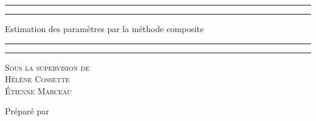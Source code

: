 \documentclass[11pt]{article}
\begin{document}
\renewcommand{\tablename}{Tableau}
\renewcommand{\figurename}{Illustration}

	\begin{titlepage}
		\centering %
		
		\scshape %
		
		\vspace*{7\baselineskip} %
		
		
		\rule{\textwidth}{1.6pt}\vspace*{-\baselineskip}\vspace*{2pt} %
		\rule{\textwidth}{0.4pt} %
		
		\vspace{0.75\baselineskip} %
		{\LARGE Estimation des paramètres par la méthode composite \\} %
		\vspace{0.75\baselineskip} %
		
		\rule{\textwidth}{0.4pt}\vspace*{-\baselineskip}\vspace{3.2pt} %
		\rule{\textwidth}{1.6pt} %
		
		\vspace{3\baselineskip} %
		
		{\scshape\Large Sous la supervision de \\ Hélène Cossette\\Étienne Marceau\\ } %
		
		\vspace*{3\baselineskip}
		
		
		\vspace*{3\baselineskip} %
		
		
		Préparé par
		

\end{titlepage}
\end{document}
